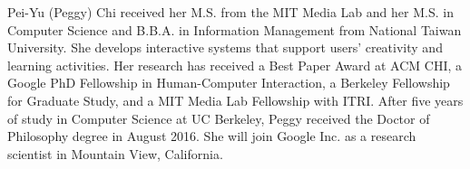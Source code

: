 \markboth{}{}

Pei-Yu (Peggy) Chi received her M.S. from the MIT Media Lab and her M.S. in Computer Science and B.B.A. in Information Management from National Taiwan University. She develops interactive systems that support users' creativity and learning activities. Her research has received a Best Paper Award at ACM CHI, a Google PhD Fellowship in Human-Computer Interaction, a Berkeley Fellowship for Graduate Study, and a MIT Media Lab Fellowship with ITRI.
%
After five years of study in Computer Science at UC Berkeley, Peggy received the Doctor of Philosophy degree in August 2016. She will join Google Inc. as a research scientist in Mountain View, California.


